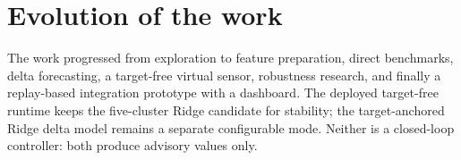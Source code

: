\section{Evolution of the work}
The work progressed from exploration to feature preparation, direct benchmarks, delta forecasting, a target-free virtual sensor, robustness research, and finally a replay-based integration prototype with a dashboard. The deployed target-free runtime keeps the five-cluster Ridge candidate for stability; the target-anchored Ridge delta model remains a separate configurable mode. Neither is a closed-loop controller: both produce advisory values only.
